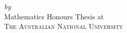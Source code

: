 \begin{titlepage}
  \vspace*{5cm}
  \makeatletter
  \begin{center}
    \begin{Huge}
      \@title
    \end{Huge}\\[0.1cm]
    \begin{Large}
      \@subtitle
    \end{Large}\leavevmode\\
    \emph{by}\\
    \@author
    \vfill
    Mathematics Honours Thesis
    at\\
    \textsc{The Australian National University}
  \end{center}
  \makeatother
\end{titlepage}

\newpage
